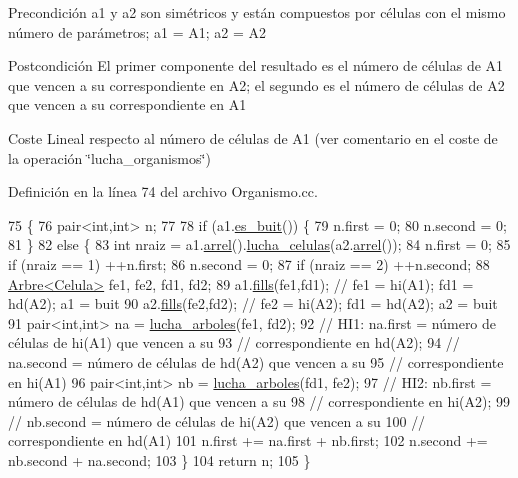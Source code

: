 \begin{DoxyPrecond}{Precondición}
a1 y a2 son simétricos y están compuestos por células con el mismo número de parámetros; a1 = A1; a2 = A2 
\end{DoxyPrecond}
\begin{DoxyPostcond}{Postcondición}
El primer componente del resultado es el número de células de A1 que vencen a su correspondiente en A2; el segundo es el número de células de A2 que vencen a su correspondiente en A1 
\end{DoxyPostcond}
\begin{DoxyParagraph}{Coste}
Lineal respecto al número de células de A1 (ver comentario en el coste de la operación \char`\"{}lucha\+\_\+organismos\char`\"{}) 
\end{DoxyParagraph}


Definición en la línea 74 del archivo Organismo.\+cc.


\begin{DoxyCode}
75 \{
76   pair<int,int> n;
77 
78   \textcolor{keywordflow}{if} (a1.\hyperlink{class_arbre_a68a51f6689f0b2889e8e1d56266fd620}{es\_buit}()) \{
79     n.first = 0; 
80     n.second = 0;
81   \}
82   \textcolor{keywordflow}{else} \{
83     \textcolor{keywordtype}{int} nraiz = a1.\hyperlink{class_arbre_aa6e2559ead7dfceda962cff11fb1a15c}{arrel}().\hyperlink{class_celula_a3dd8be98f1548b02696e2fc32b8d19b4}{lucha\_celulas}(a2.\hyperlink{class_arbre_aa6e2559ead7dfceda962cff11fb1a15c}{arrel}());
84     n.first = 0; 
85     \textcolor{keywordflow}{if} (nraiz == 1) ++n.first;
86     n.second = 0;
87     \textcolor{keywordflow}{if} (nraiz == 2) ++n.second;
88     \hyperlink{class_arbre}{Arbre<Celula>} fe1, fe2, fd1, fd2; 
89     a1.\hyperlink{class_arbre_aee75355cee7599e132de75781d26a61d}{fills}(fe1,fd1); \textcolor{comment}{// fe1 = hi(A1); fd1 = hd(A2); a1 = buit }
90     a2.\hyperlink{class_arbre_aee75355cee7599e132de75781d26a61d}{fills}(fe2,fd2); \textcolor{comment}{// fe2 = hi(A2); fd1 = hd(A2); a2 = buit}
91     pair<int,int> na = \hyperlink{class_organismo_aaf643a47840f855ed3e105970f75a078}{lucha\_arboles}(fe1, fd2);
92     \textcolor{comment}{//       HI1: na.first = número de células de hi(A1) que vencen a su }
93     \textcolor{comment}{//                       correspondiente en hd(A2);}
94     \textcolor{comment}{//            na.second = número de células de hd(A2) que vencen a su }
95     \textcolor{comment}{//                        correspondiente en hi(A1)}
96     pair<int,int> nb = \hyperlink{class_organismo_aaf643a47840f855ed3e105970f75a078}{lucha\_arboles}(fd1, fe2);
97     \textcolor{comment}{//       HI2: nb.first = número de células de hd(A1) que vencen a su }
98     \textcolor{comment}{//                       correspondiente en hi(A2);}
99     \textcolor{comment}{//            nb.second = número de células de hi(A2) que vencen a su }
100     \textcolor{comment}{//                        correspondiente en hd(A1)}
101     n.first += na.first + nb.first;
102     n.second += nb.second + na.second;
103   \}
104   \textcolor{keywordflow}{return} n;
105 \}
\end{DoxyCode}
